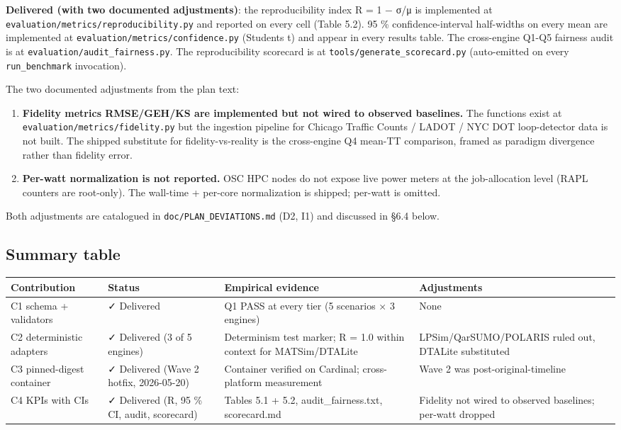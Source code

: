 \textbf{Delivered (with two documented adjustments)}: the
reproducibility index R = 1 − σ/μ is implemented at
\texttt{evaluation/metrics/reproducibility.py} and reported on every
cell (Table 5.2). 95 \% confidence-interval half-widths on every mean
are implemented at \texttt{evaluation/metrics/confidence.py}
(Student\textquotesingle s t) and appear in every results table. The
cross-engine Q1-Q5 fairness audit is at
\texttt{evaluation/audit\_fairness.py}. The reproducibility scorecard is
at \texttt{tools/generate\_scorecard.py} (auto-emitted on every
\texttt{run\_benchmark} invocation).

The two documented adjustments from the plan text:

\begin{enumerate}
\def\labelenumi{\arabic{enumi}.}
\item
  \textbf{Fidelity metrics RMSE/GEH/KS are implemented but not wired to
  observed baselines.} The functions exist at
  \texttt{evaluation/metrics/fidelity.py} but the ingestion pipeline for
  Chicago Traffic Counts / LADOT / NYC DOT loop-detector data is not
  built. The shipped substitute for fidelity-vs-reality is the
  cross-engine Q4 mean-TT comparison, framed as paradigm divergence
  rather than fidelity error.
\item
  \textbf{Per-watt normalization is not reported.} OSC HPC nodes do not
  expose live power meters at the job-allocation level (RAPL counters
  are root-only). The wall-time + per-core normalization is shipped;
  per-watt is omitted.
\end{enumerate}

Both adjustments are catalogued in \texttt{doc/PLAN\_DEVIATIONS.md}
(D2, I1) and discussed in §6.4 below.

\subsection{Summary table}\label{615-summary-table}

\begin{longtable}[]{@{}llll@{}}
\toprule\noalign{}
Contribution & Status & Empirical evidence & Adjustments \\
\midrule\noalign{}
\endhead
\bottomrule\noalign{}
\endlastfoot
C1 schema + validators & ✓ Delivered & Q1 PASS at every tier (5
scenarios × 3 engines) & None \\
C2 deterministic adapters & ✓ Delivered (3 of 5 engines) & Determinism
test marker; R = 1.0 within context for MATSim/DTALite &
LPSim/QarSUMO/POLARIS ruled out, DTALite substituted \\
C3 pinned-digest container & ✓ Delivered (Wave 2 hotfix, 2026-05-20) &
Container verified on Cardinal; cross-platform measurement & Wave 2 was
post-original-timeline \\
C4 KPIs with CIs & ✓ Delivered (R, 95 \% CI, audit, scorecard) & Tables
5.1 + 5.2, audit\_fairness.txt, scorecard.md & Fidelity not wired to
observed baselines; per-watt dropped \\
\end{longtable}

